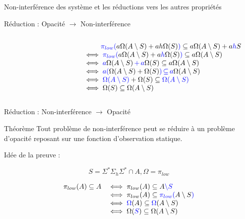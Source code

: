 \documentclass[11pt]{beamer}
\begin{document}
\begin{section}{Non-interf\'erence des syst\`eme et les r\'eductions vers les autres propri\'et\'es}
\begin{frame}{R\'eduction : Opacit\'e $\to$ Non-interf\'erence}
\begin{columns}
\begin{column}{.30\textwidth}
\begin{figure}[H]
\begin{tikzpicture}
  \end{tikzpicture}
\end{figure}
 \end{column}

 \begin{column}{.8\textwidth}
 \begin{flushleft}
$$\begin{array}{l}
\phantom{\iff} \textcolor{blue}{\pi_{low}(}a\Omega(A\setminus S) + a h \Omega(S)\textcolor{blue}{)}\subseteq a\Omega(A\setminus S) + a \textcolor{blue}{h} S\\
\iff \textcolor{blue}{\pi_{low}(}a\Omega(A\setminus S) + a \textcolor{blue}{h} \Omega(S)\textcolor{blue}{)}\subseteq a\Omega(A\setminus S)\\
\iff \textcolor{blue}{a}\Omega(A\setminus S) \,\textcolor{blue}{+}\, \textcolor{blue}{a} \Omega(S)\subseteq a\Omega(A\setminus S)\\
\iff \textcolor{blue}{a(}\Omega(A\setminus S) + \Omega(S)\textcolor{blue}{)}\,\textcolor{blue}{\subseteq}\, \textcolor{blue}{a}\Omega(A\setminus S)\\
\iff \textcolor{blue}{\Omega(A\setminus S)} + \Omega(S)\subseteq \textcolor{blue}{\Omega(A\setminus S)}\\
\iff \Omega(S) \subseteq \Omega(A\setminus S)\\
\end{array}
$$
\end{flushleft}
 \end{column}
\end{columns}




\end{frame}

\begin{frame}{R\'eduction : Non-interf\'erence $\to$ Opacit\'e}
\begin{beamerlikethm}{Th\'eor\`eme {\cite[page 5]{BryansKMR08}}}
Tout probl\`eme de non-interf\'erence peut se r\'eduire \`a un probl\`eme d'opacit\'e reposant sur une fonction d'observation statique.
\end{beamerlikethm}

Id\'ee de la preuve :

$$S=\Sigma^*\Sigma_h\Sigma^*\cap A, \Omega = \pi_{low}$$

$$\begin{array}{ll}
\pi_{low}(A) \subseteq A & \iff \pi_{low}(A) \subseteq A \textcolor{blue}{\setminus S}\\
& \iff \pi_{low}(A) \subseteq \textcolor{blue}{\pi_{low}(}A \setminus S\textcolor{blue}{)}\\
& \iff \textcolor{blue}{\Omega}(A) \subseteq \textcolor{blue}{\Omega}(A \setminus S)\\
& \iff \Omega(\textcolor{blue}{S}) \subseteq \Omega(A \setminus S)
\end{array}$$
\end{frame}

\end{section}
\end{document}
